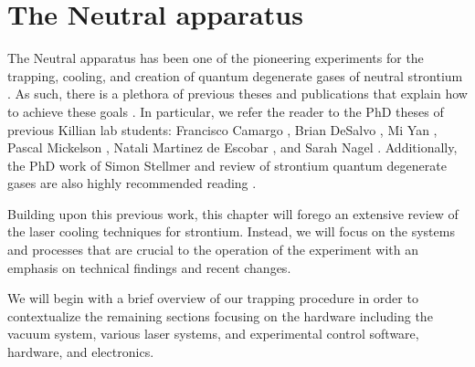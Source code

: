 \chapter{The Neutral apparatus}
\label{ch:chap2}

The Neutral apparatus has been one of the pioneering experiments for the trapping, cooling, and creation of quantum degenerate gases of neutral strontium \cite{nsl03,Nagel2005a,Yan2013c,Yan2013b,dym10,Mickelson2010ja,mms05,mmy09arxiv,MartinezDeEscobar2008,mmy09a,Traverso2009,mma09,Borkowski2014a}. 
As such, there is a plethora of previous theses and publications that explain how to achieve these goals \cite{Loftus2004,Mukaiyama2003a,Reschovsky}. 
In particular, we refer the reader to the PhD theses of previous Killian lab students: Francisco Camargo \cite{Camargo2017}, Brian DeSalvo \cite{DeSalvo2015Thesis}, Mi Yan \cite{Yan2013d}, Pascal Mickelson \cite{Mickelson2010b}, Natali Martinez de Escobar \cite{MartinezdeEscolar2010}, and Sarah Nagel \cite{Nagel2008}. 
Additionally, the PhD work of Simon Stellmer \cite{SimonStellmer2013} and review of strontium quantum degenerate gases are also highly recommended reading \cite{StellmerRev2013}.

Building upon this previous work, this chapter will forego an extensive review of the laser cooling techniques for strontium. 
Instead, we will focus on the systems and processes that are crucial to the operation of the experiment with an emphasis on technical findings and recent changes.


We will begin with a brief overview of our trapping procedure in order to contextualize the remaining sections focusing on the hardware including the vacuum system, various laser systems, and experimental control software, hardware, and electronics.


